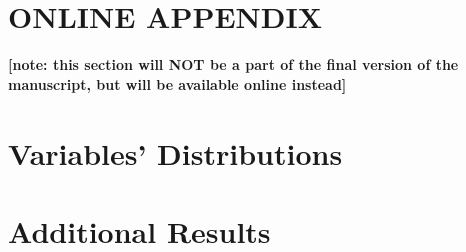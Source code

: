 \documentclass[10pt, letterpaper]{article}
\begin{document}
\begin{spacing}{1.4}






 \section*{\Huge ONLINE APPENDIX}
 \textbf{[note: this section will NOT be a part of the final version of
   the manuscript, but will be available online instead]} %





\section{Variables' Distributions}



\section{Additional Results}



\end{spacing}
\end{document}
